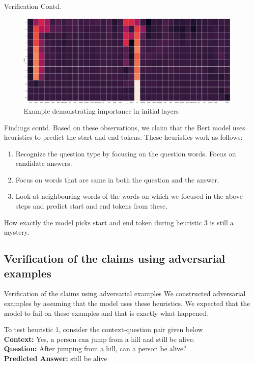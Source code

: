 \documentclass[10pt]{beamer}
\begin{document}
\begin{frame}{Verification Contd.}
\begin{figure}
    \includegraphics[scale=0.2]{obs1.png}
    \caption{Example demonstrating importance in initial layers}
    \label{ex1}
\end{figure}
\end{frame}

\begin{frame}{Findings contd.}
    Based on these observations, we claim that the Bert model uses heuristics to predict the start and end tokens. These heuristics work as follows:

\begin{enumerate}
    \item Recognize the question type by focusing on the question words. Focus on candidate answers.
    \item Focus on words that are same in both the question and the answer.
    \item Look at neighbouring words of the words on which we focused in the above steps and predict start and end tokens from these.
\end{enumerate}

How exactly the model picks start and end token during heuristic 3 is still a mystery.
\end{frame}

\subsection{Verification of the claims using adversarial examples}
\begin{frame}{Verification of the claims using adversarial examples}
We constructed adversarial examples by assuming that the model uses these heuristics. We expected that the model to fail on these examples and that is exactly what happened.

To test heuristic 1, consider the context-question pair given below\\
\textbf{Context: }Yes, a person can jump from a hill and still be alive.\\
\textbf{Question: }After jumping from a hill, can a person be alive?\\
\textbf{Predicted Answer: }still be alive 
\end{frame}
\end{document}
